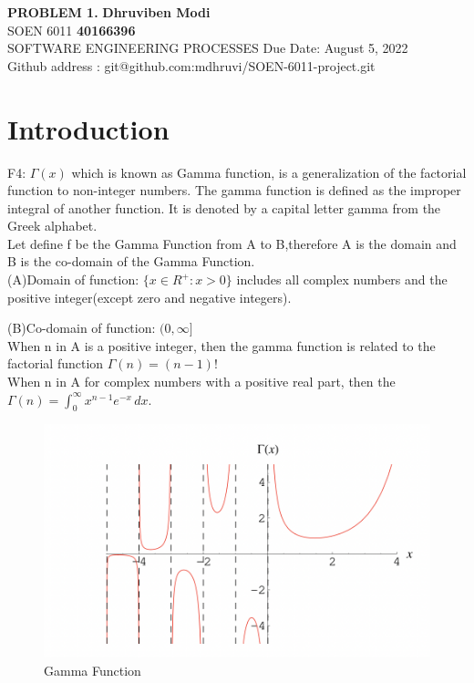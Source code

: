 \documentclass{article}
\begin{document}
\noindent
\large\textbf{PROBLEM 1.} \hfill \textbf{Dhruviben Modi} \\
\normalsize SOEN 6011 \hfill \textbf{40166396} \\
 SOFTWARE ENGINEERING PROCESSES \hfill Due Date: August 5, 2022 \\
\hfill Github address : git@github.com:mdhruvi/SOEN-6011-project.git

\section{Introduction}

F4: $\Gamma \left( x \right)$ which is known as Gamma function, is a generalization of the factorial function to non-integer numbers. The gamma function is defined as the improper integral of another function. It is denoted by a capital letter gamma from the Greek alphabet. \\

Let define f be the Gamma Function from A to B,therefore A is the domain and B is the  co-domain of the Gamma Function. \\
\indent(A)Domain of function: $\{x \in R^+: x > 0\}$ includes all complex numbers and the positive integer(except zero and negative integers).

(B)Co-domain of function: $(0, \infty]$\\
\indent\indent\indent When n in A is a positive integer, then the gamma function is related to the factorial function  $\Gamma(n) = (n-1)!$ \\
\indent\indent\indent When n in A for complex numbers with a positive real part, then the ${\displaystyle \Gamma (n)=\int _{0}^{\infty }x^{n-1}e^{-x}\,dx.}$

\begin{figure}[h]
    \centering
    \includegraphics[width=0.4\linewidth]{Images/gammafun.png}
    \caption{Gamma Function}
    \label{fig:Gamma function}
\end{figure}
\end{document}
